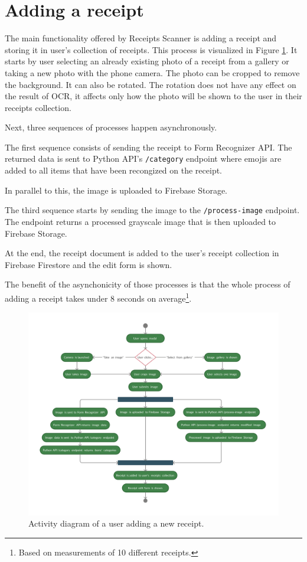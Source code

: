 \documentclass[
  digital, %
  table,   %
  oneside, %
  lof,     %
  lot,     %
]{fithesis3}
\begin{document}
\section{Adding a receipt}
The main functionality offered by Receipts Scanner is adding a receipt and storing it in user's collection of receipts.
This process is visualized in Figure \ref{fig:add_receipt_android}.
It starts by user selecting an already existing photo of a receipt from a gallery or taking a new photo with the phone camera. The photo can be cropped to remove the background. It can also be rotated. The rotation does not have any effect on the result of OCR, it affects only how the photo will be shown to the user in their receipts collection.

Next, three sequences of processes happen asynchronously.

The first sequence consists of sending the receipt to Form Recognizer API. The returned data is sent to Python API's \texttt{/category} endpoint where emojis are added to all items that have been recongized on the receipt.

In parallel to this, the image is uploaded to Firebase Storage.

The third sequence starts by sending the image to the \texttt{/process-image} endpoint. The endpoint returns a processed grayscale image that is then uploaded to Firebase Storage.

At the end, the receipt document is added to the user's receipt collection in Firebase Firestore and the edit form is shown. 

The benefit of the asynchonicity of those processes is that the whole process of adding a receipt takes under 8 seconds on average\footnote{Based on measurements of 10 different receipts.}.

\begin{figure}
    \begin{center}
        \includegraphics[width=\textwidth]{figures/diagrams/Add_receipt_Android}
    \end{center}
    \caption{Activity diagram of a user adding a new receipt.}
    \label{fig:add_receipt_android}
\end{figure}
\end{document}
